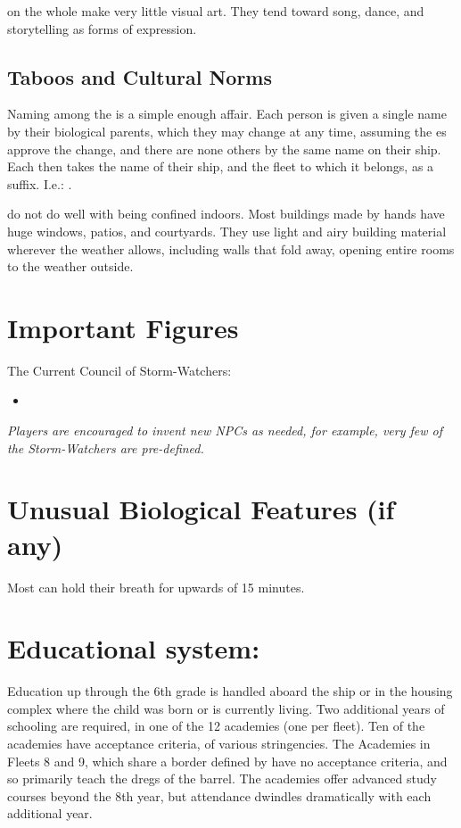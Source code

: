 \documentclass[blue]{GL2020}
\begin{document}
\pShippies{} on the whole make very little visual art. They tend toward song, dance, and storytelling as forms of expression.

\subsection*{Taboos and Cultural Norms}
Naming among the \pShip{} is a simple enough affair. Each person is given a single name by their biological parents, which they may change at any time, assuming the \cEbb{\God}es approve the change, and there are none others by the same name on their ship. Each \pShippies{} then takes the name of their ship, and the fleet to which it belongs, as a suffix. I.e.: \cLoud{\full}.

\pShippies{} do not do well with being confined indoors. Most buildings made by \pShip{} hands have huge windows, patios, and courtyards. They use light and airy building material wherever the weather allows, including walls that fold away, opening entire rooms to the weather outside.

\section*{Important Figures}
The Current Council of Storm-Watchers:
\begin{itemize}
	\item \cLoud{}
\end{itemize}

\emph{Players are encouraged to invent new NPCs as needed, for example, very few of the Storm-Watchers are pre-defined.}

\section*{Unusual Biological Features (if any)}
Most \pShippies{} can hold their breath for upwards of 15 minutes.

\section{Educational system:}
Education up through the 6th grade is handled aboard the ship or in the housing complex where the child was born or is currently living. Two additional years of schooling are required, in one of the 12 academies (one per fleet). Ten of the academies have acceptance criteria, of various stringencies. The Academies in Fleets 8 and 9, which share a border defined by \pWod{} have no acceptance criteria, and so primarily teach the dregs of the barrel. The academies offer advanced study courses beyond the 8th year, but attendance dwindles dramatically with each additional year.
\end{document}
